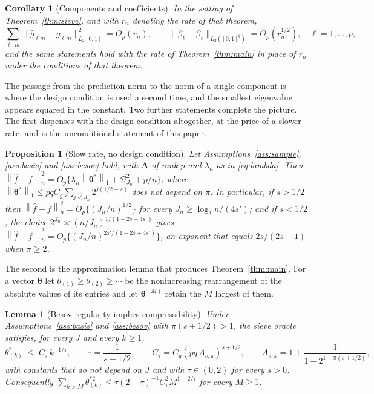 \documentclass[12pt]{article} %
\newtheorem{lemma}{Lemma}
\newtheorem{corollary}{Corollary}
\newtheorem{proposition}{Proposition}
\theoremstyle{definition}
\newcommand{\norm}[1]{\left\lVert #1 \right\rVert}
\newcommand{\normn}[1]{\left\lVert #1 \right\rVert_{n}}
\newcommand{\cv}{\ell}
\newcommand{\md}{m}
\newcommand{\lev}{j}
\newcommand{\fcoef}[1]{\beta_{#1}}
\newcommand{\gcomp}[2]{g_{#1#2}}
\newcommand{\btheta}{\boldsymbol{\theta}}
\newcommand{\thetastar}{\btheta^{*}}
\newcommand{\penn}{\lambda_{n}}
\newcommand{\seff}{s'}
\newcommand{\Amat}{\mathbf{A}}
\begin{document}
\begin{corollary}[Components and coefficients]
\label{cor:components}
In the setting of Theorem~\ref{thm:sieve}, and with $r_n$ denoting the rate of
that theorem,
\[
  \sum_{\cv,\md}\bigl\lVert\widehat{g}_{\cv\md}-\gcomp{\cv}{\md}
  \bigr\rVert_{L_2[0,1]}^{2} = O_p(r_n),
  \qquad
  \bigl\lVert\widehat{\fcoef{\cv}}-\fcoef{\cv}
  \bigr\rVert_{L_2([0,1]^{q})} = O_p(r_n^{1/2}),
  \quad \cv = 1,\dots,p,
\]
and the same statements hold with the rate of Theorem~\ref{thm:main} in place
of $r_n$ under the conditions of that theorem.
\end{corollary}

The passage from the prediction norm to the norm of a single component is
where the design condition is used a second time, and the smallest eigenvalue
appears squared in the constant. Two further statements complete the picture.
The first dispenses with the design condition altogether, at the price of a
slower rate, and is the unconditional statement of this paper.

\begin{proposition}[Slow rate, no design condition]
\label{prop:slow}
Let Assumptions~\ref{ass:sample}, \ref{ass:basis} and \ref{ass:besov} hold,
with $\Amat$ of rank $p$ and $\penn$ as in \eqref{eq:lambda}. Then
$\normn{\widehat{f}-f}^{2} = O_p\{\penn\norm{\thetastar}_{1} +
\mathcal{B}_{J_n}^{2} + p/n\}$, where
$\norm{\thetastar}_{1} \le pqC_g\sum_{\lev<J_n}2^{\lev(1/2-s)}$ does not
depend on $\pi$. In particular, if $s > 1/2$ then
$\normn{\widehat{f}-f}^{2} = O_p\{(J_n/n)^{1/2}\}$ for every
$J_n \ge \log_2 n/(4\seff)$; and if $s < 1/2$, the choice
$2^{J_n} \asymp (n/J_n)^{1/(1-2s+4\seff)}$ gives
$\normn{\widehat{f}-f}^{2} = O_p\{(J_n/n)^{2\seff/(1-2s+4\seff)}\}$, an
exponent that equals $2s/(2s+1)$ when $\pi \ge 2$.
\end{proposition}

The second is the approximation lemma that produces Theorem~\ref{thm:main}.
For a vector $\btheta$ let $\theta_{(1)} \ge \theta_{(2)} \ge \cdots$ be the
nonincreasing rearrangement of the absolute values of its entries and let
$\btheta^{(M)}$ retain the $M$ largest of them.

\begin{lemma}[Besov regularity implies compressibility]
\label{lem:weak}
Under Assumptions~\ref{ass:basis} and \ref{ass:besov} with
$\pi(s+1/2) > 1$, the sieve oracle satisfies, for every $J$ and every
$k \ge 1$,
\[
  \theta^{*}_{(k)} \;\le\; C_\tau\,k^{-1/\tau},
  \qquad \tau = \frac{1}{s+1/2},
  \qquad C_\tau = C_g(pq\,A_{s,\pi})^{s+1/2},
  \qquad A_{s,\pi} = 1 + \frac{1}{1-2^{1-\pi(s+1/2)}},
\]
with constants that do not depend on $J$ and with $\tau \in (0,2)$ for every
$s > 0$. Consequently
$\sum_{k>M}\theta^{*2}_{(k)} \le \tau(2-\tau)^{-1}C_\tau^{2}M^{1-2/\tau}$ for
every $M \ge 1$.
\end{lemma}
\end{document}
